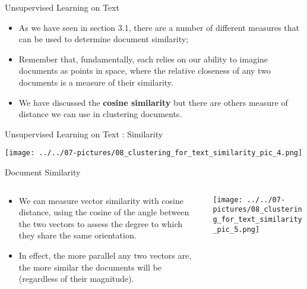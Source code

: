 \documentclass[11pt]{beamer}
\begin{document}
\begin{frame}{Unsupervised Learning on Text}
	\begin{itemize}
		\item As we have seen in section 3.1, there are a number of different measures that can be used to determine document similarity; 
		\item Remember that, fundamentally, each relies on our ability to imagine documents as points in space, where the relative closeness of any two documents is a measure of their similarity.
		\item We have discussed the \textbf{cosine similarity} but there are others measure of distance we can use in clustering documents. 
	\end{itemize}
\end{frame}
\begin{frame}{Unsupervised Learning on Text : Similarity}
	\begin{center}
	\texttt{[image: ../../07-pictures/08\_clustering\_for\_text\_similarity\_pic\_4.png]}
	\end{center}
\end{frame}
\begin{frame}{Document Similarity}
\begin{columns}[T] %
\begin{column}{.48\textwidth}
        \begin{itemize}
		\item We can measure vector similarity with cosine distance, using the cosine of the angle between the two vectors to assess the degree to which they share the same orientation. 
		\item In effect, the more parallel any two vectors are, the more similar the documents will be (regardless of their magnitude).
        \end{itemize}
\end{column}%
\hfill%
\begin{column}{.48\textwidth}
        \texttt{[image: ../../07-pictures/08\_clustering\_for\_text\_similarity\_pic\_5.png]}
\end{column}%
\end{columns}
\end{frame}
\end{document}
